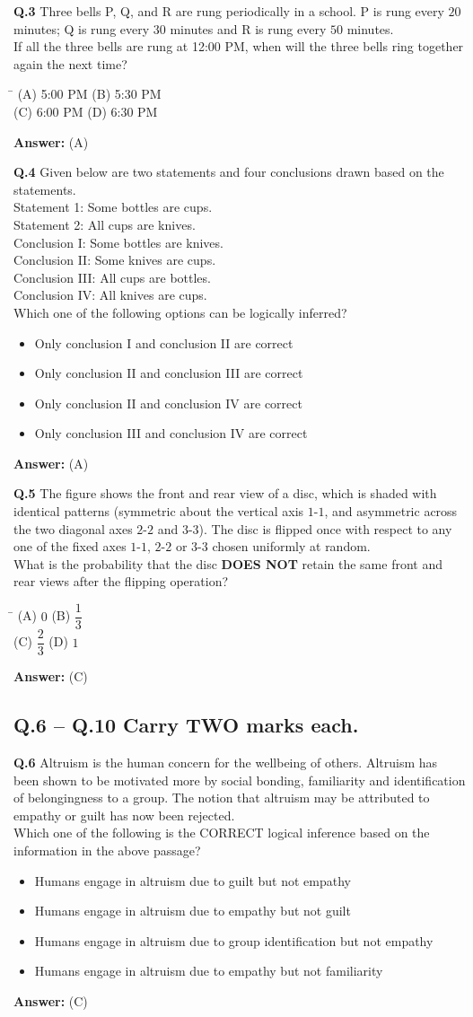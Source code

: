 \documentclass[11pt,a4paper]{article}
\newcommand{\optsfourA}[4]{%
  \begin{tabbing}
    \hspace{0.48\linewidth}\=\kill
    (A) #1 \> (B) #2 \\[2pt]
    (C) #3 \> (D) #4
  \end{tabbing}%
}
\newcommand{\optslistA}[4]{%
  \begin{itemize}
    \setlength{\itemsep}{2pt}\setlength{\parskip}{0pt}
    \item[(A)] #1
    \item[(B)] #2
    \item[(C)] #3
    \item[(D)] #4
  \end{itemize}%
}
\newcommand{\ans}[1]{\textbf{Answer:} #1\par\medskip}
\begin{document}
\textbf{Q.3} Three bells P, Q, and R are rung periodically in a school. P is rung every $20$ minutes; Q is rung every $30$ minutes and R is rung every $50$ minutes.\\
If all the three bells are rung at 12:00 PM, when will the three bells ring together again the next time?
\optsfourA{5:00 PM}{5:30 PM}{6:00 PM}{6:30 PM}
\ans{(A)}

\textbf{Q.4} Given below are two statements and four conclusions drawn based on the statements.\\
Statement 1: Some bottles are cups.\\
Statement 2: All cups are knives.\\
Conclusion I: Some bottles are knives.\\
Conclusion II: Some knives are cups.\\
Conclusion III: All cups are bottles.\\
Conclusion IV: All knives are cups.\\
Which one of the following options can be logically inferred?
\optslistA{Only conclusion I and conclusion II are correct}{Only conclusion II and conclusion III are correct}{Only conclusion II and conclusion IV are correct}{Only conclusion III and conclusion IV are correct}
\ans{(A)}

\textbf{Q.5} The figure shows the front and rear view of a disc, which is shaded with identical patterns (symmetric about the vertical axis $1$-$1$, and asymmetric across the two diagonal axes $2$-$2$ and $3$-$3$). The disc is flipped once with respect to any one of the fixed axes $1$-$1$, $2$-$2$ or $3$-$3$ chosen uniformly at random.\\
What is the probability that the disc \textbf{DOES NOT} retain the same front and rear views after the flipping operation?
\optsfourA{$0$}{$\dfrac{1}{3}$}{$\dfrac{2}{3}$}{$1$}
\ans{(C)}

\subsection*{Q.6 -- Q.10 Carry TWO marks each.}

\textbf{Q.6} Altruism is the human concern for the wellbeing of others. Altruism has been shown to be motivated more by social bonding, familiarity and identification of belongingness to a group. The notion that altruism may be attributed to empathy or guilt has now been rejected.\\
Which one of the following is the CORRECT logical inference based on the information in the above passage?
\optslistA{Humans engage in altruism due to guilt but not empathy}{Humans engage in altruism due to empathy but not guilt}{Humans engage in altruism due to group identification but not empathy}{Humans engage in altruism due to empathy but not familiarity}
\ans{(C)}
\end{document}
